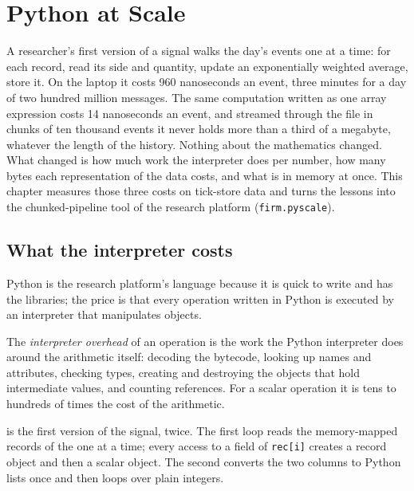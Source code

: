 \chapter{Python at Scale}\label{ch:pl:python-at-scale}

A researcher's first version of a signal walks the day's events one at a time: for each record, read its side and quantity,
update an exponentially weighted average, store it. On the laptop it costs 960 nanoseconds an event, three minutes for a day of
two hundred million messages. The same computation written as one array expression costs 14 nanoseconds an event, and streamed
through the file in chunks of ten thousand events it never holds more than a third of a megabyte, whatever the length of the
history. Nothing about the mathematics changed. What changed is how much work the interpreter does per number, how many bytes
each representation of the data costs, and what is in memory at once. This chapter measures those three costs on tick-store
data and turns the lessons into the chunked-pipeline tool of the research platform (\texttt{firm.pyscale}).

\section{What the interpreter costs}

Python is the research platform's language because it is quick to write and has the libraries; the price is that every
operation written in Python is executed by an interpreter that manipulates objects.

\begin{definition}\label{def:pl:python-at-scale:overhead}
The \emph{interpreter overhead} of an operation is the work the Python interpreter does around the
arithmetic itself: decoding the bytecode, looking up names and attributes, checking types, creating and destroying the objects
that hold intermediate values, and counting references. For a scalar operation it is tens to hundreds of times the cost of the
arithmetic.
\end{definition}

 is the first version of the signal, twice. The first loop reads the memory-mapped records of
the  one at a time; every access to a field of \texttt{rec[i]} creates a record object and then a scalar object. The second converts
the two columns to Python lists once and then loops over plain integers.

